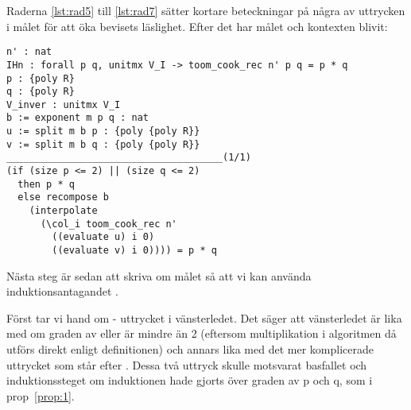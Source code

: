 Raderna \ref{lst:rad5} till \ref{lst:rad7} sätter kortare beteckningar på några
av uttrycken i målet för att öka bevisets läslighet. Efter det har målet och
kontexten blivit:
\begin{lstlisting}
n' : nat
IHn : forall p q, unitmx V_I -> toom_cook_rec n' p q = p * q
p : {poly R}
q : {poly R}
V_inver : unitmx V_I
b := exponent m p q : nat
u := split m b p : {poly {poly R}}
v := split m b q : {poly {poly R}}
______________________________________(1/1)
(if (size p <= 2) || (size q <= 2)
  then p * q
  else recompose b
    (interpolate
      (\col_i toom_cook_rec n'
        ((evaluate u) i 0)
        ((evaluate v) i 0)))) = p * q
\end{lstlisting}
Nästa steg är sedan att skriva om målet så att vi kan använda
induktionsantagandet .

Först tar vi hand om  - uttrycket i vänsterledet.
Det säger att vänsterledet är lika med  om graden
av  eller  är mindre än 2 (eftersom multiplikation i algoritmen
då utförs direkt enligt definitionen) och annars
lika med det mer komplicerade uttrycket som står efter . Dessa två
uttryck skulle motsvarat basfallet och induktionssteget om induktionen hade
gjorts över graden av p och q, som i prop~\ref{prop:1}.

